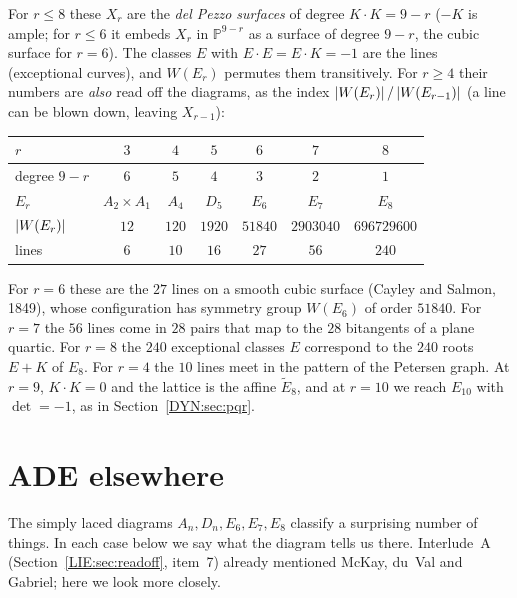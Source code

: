For $r\le8$ these $X_r$ are the \emph{del Pezzo surfaces} of degree $K\cdot K=9-r$ ($-K$ is ample; for
$r\le6$ it embeds $X_r$ in $\mathbb P^{9-r}$ as a surface of degree $9-r$, the cubic surface for $r=6$). The classes $E$ with $E\cdot E=E\cdot K=-1$ are the lines (exceptional curves), and $W(E_r)$
permutes them transitively. For $r\ge4$ their numbers are \emph{also} read off the diagrams, as the index
$\left\lvert W(E_r) \right\rvert/\left\lvert W(E_{r-1}) \right\rvert$ (a line can be blown down, leaving $X_{r-1}$):
\begin{center}
\renewcommand{\arraystretch}{1.15}
\begin{tabular}{lcccccc}
\toprule
$r$ & $3$ & $4$ & $5$ & $6$ & $7$ & $8$\\
\midrule
degree $9-r$ & $6$ & $5$ & $4$ & $3$ & $2$ & $1$\\
$E_r$ & $A_2\times A_1$ & $A_4$ & $D_5$ & $E_6$ & $E_7$ & $E_8$\\
$\left\lvert W(E_r) \right\rvert$ & $12$ & $120$ & $1920$ & $51840$ & $2903040$ & $696729600$\\
lines & $6$ & $10$ & $16$ & $27$ & $56$ & $240$\\
\bottomrule
\end{tabular}
\end{center}
For $r=6$ these are the $27$ lines on a smooth cubic surface (Cayley and Salmon, 1849), whose
configuration has symmetry group $W(E_6)$ of order $51840$. For $r=7$ the $56$ lines come in $28$ pairs that
map to the $28$ bitangents of a plane quartic. For $r=8$ the $240$ exceptional classes $E$ correspond to the
$240$ roots $E+K$ of $E_8$. For $r=4$ the $10$ lines meet in the pattern of the Petersen graph. At $r=9$,
$K\cdot K=0$ and the lattice is the affine $\tilde E_8$, and at $r=10$ we reach $E_{10}$ with $\det=-1$, as in
Section~\ref{DYN:sec:pqr}.

\section{ADE elsewhere}
\label{DYN:sec:elsewhere}

The simply laced diagrams $A_n,D_n,E_6,E_7,E_8$ classify a surprising number of things. In each case
below we say what the diagram tells us there. Interlude~A (Section~\ref{LIE:sec:readoff}, item~7) already
mentioned McKay, du~Val and Gabriel; here we look more closely.

